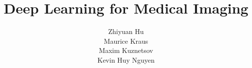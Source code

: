 \documentclass[colorback,accentcolor=tud1c,linedtoc,bibtotoc]{tudreport}
\title{Deep Learning for Medical Imaging}
\subtitle{Zhiyuan Hu \\
Maurice Kraus \\ Maxim Kuznetsov \\ Kevin Huy Nguyen }
\begin{document}
\maketitle


\tableofcontents 







\begin{thebibliography}{99}



\end{thebibliography}
\end{document}

